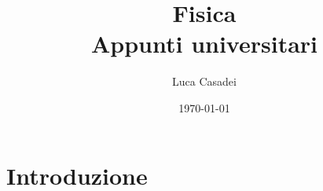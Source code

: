 \documentclass[a4paper,12pt]{report}
\title{\textbf{Fisica}\\Appunti universitari}
\author{Luca Casadei}
\date{\today}
\begin{document}
	\maketitle
	\tableofcontents
	\chapter{Introduzione}
\end{document}
